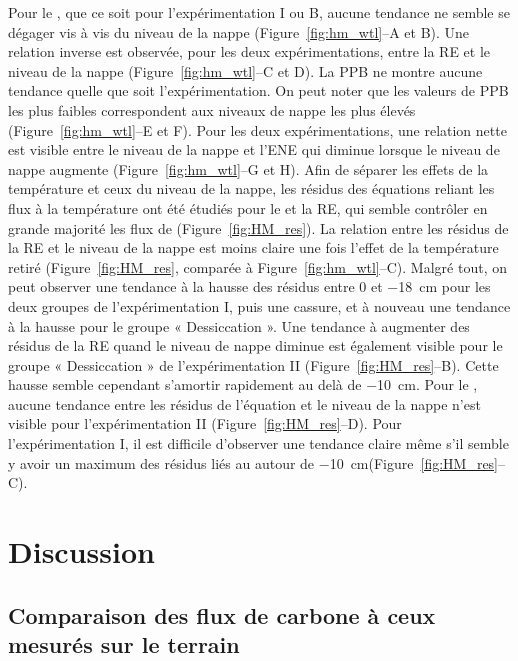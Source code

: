 Pour le \chh, que ce soit pour l'expérimentation I ou B, aucune tendance ne semble se dégager vis à vis du niveau de la nappe (Figure~\ref{fig:hm_wtl}--A et B).
Une relation inverse est observée, pour les deux expérimentations, entre la RE et le niveau de la nappe (Figure~\ref{fig:hm_wtl}--C et D).
La PPB ne montre aucune tendance quelle que soit l'expérimentation.
On peut noter que les valeurs de PPB les plus faibles correspondent aux niveaux de nappe les plus élevés (Figure~\ref{fig:hm_wtl}--E et F).
Pour les deux expérimentations, une relation nette est visible entre le niveau de la nappe et l'ENE qui diminue lorsque le niveau de nappe augmente (Figure~\ref{fig:hm_wtl}--G et H).
Afin de séparer les effets de la température et ceux du niveau de la nappe, les résidus des équations reliant les flux à la température ont été étudiés pour le \chh et la RE, qui semble contrôler en grande majorité les flux de \coo (Figure~\ref{fig:HM_res}).
La relation entre les résidus de la RE et le niveau de la nappe est moins claire une fois l'effet de la température retiré (Figure~\ref{fig:HM_res}, comparée à Figure~\ref{fig:hm_wtl}--C).
Malgré tout, on peut observer une tendance à la hausse des résidus entre 0 et \SI{-18}{\centi\metre} pour les deux groupes de l'expérimentation I, puis une cassure, et à nouveau une tendance à la hausse pour le groupe « Dessiccation ».
Une tendance à augmenter des résidus de la RE quand le niveau de nappe diminue est également visible pour le groupe « Dessiccation » de l'expérimentation II (Figure~\ref{fig:HM_res}--B).
Cette hausse semble cependant s'amortir rapidement au delà de \SI{-10}{\centi\metre}.
Pour le \chh, aucune tendance entre les résidus de l'équation et le niveau de la nappe n'est visible pour l'expérimentation II (Figure~\ref{fig:HM_res}--D).
Pour l'expérimentation I, il est difficile d'observer une tendance claire même s'il semble y avoir un maximum des résidus liés au \chh autour de \SI{-10}{\centi\metre}(Figure~\ref{fig:HM_res}--C).


\section{Discussion}

\subsection{Comparaison des flux de carbone à ceux mesurés sur le terrain}
\subsubsection{\chh}

